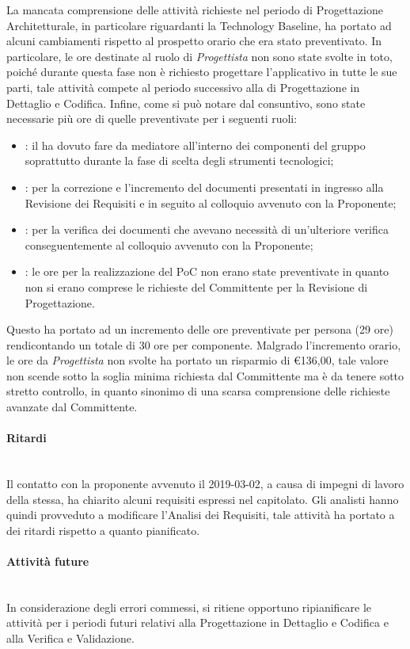 La mancata comprensione delle attività richieste nel periodo di Progettazione Architetturale, in particolare riguardanti la Technology Baseline, ha portato ad alcuni cambiamenti rispetto al prospetto orario che era stato preventivato. In particolare, le ore destinate al ruolo di \textit{Progettista} non sono state svolte in toto, poiché durante questa fase non è richiesto progettare l'applicativo in tutte le sue parti, tale attività compete al periodo successivo alla di Progettazione in Dettaglio e Codifica. Infine, come si può notare dal consuntivo, sono state necessarie più ore di quelle preventivate per i seguenti ruoli:
\begin{itemize}
	\item \RdP{}: il \Res{} ha dovuto fare da mediatore all'interno dei componenti del gruppo soprattutto durante la fase di scelta degli strumenti tecnologici;
	\item \ana{}: per la correzione e l'incremento del documenti presentati in ingresso alla Revisione dei Requisiti e in seguito al colloquio avvenuto con la Proponente;
	\item \ver{}: per la verifica dei documenti che avevano necessità di un'ulteriore verifica conseguentemente al colloquio avvenuto con la Proponente;
	\item \progr{}: le ore per la realizzazione del PoC non erano state preventivate  in quanto non si erano comprese le richieste del Committente per la Revisione di Progettazione. 
\end{itemize} 
Questo ha portato ad un incremento delle ore preventivate per persona (29 ore) rendicontando un totale di 30 ore per componente.
Malgrado l'incremento orario, le ore da \textit{Progettista} non svolte ha portato un risparmio di \euro 136,00, tale valore non scende sotto la soglia minima richiesta dal Committente ma è da tenere sotto stretto controllo, in quanto sinonimo di una scarsa comprensione delle richieste avanzate dal Committente.
\paragraph{Ritardi}\mbox{}\\
Il contatto con la proponente avvenuto il 2019-03-02, a causa di impegni di lavoro della stessa, ha chiarito alcuni requisiti espressi nel capitolato. Gli analisti hanno quindi provveduto a modificare l'Analisi dei Requisiti, tale attività ha portato a dei ritardi rispetto a quanto pianificato.

\paragraph{Attività future}\mbox{}\\
In considerazione degli errori commessi, si ritiene opportuno ripianificare le attività per i periodi futuri 
relativi alla Progettazione in Dettaglio e Codifica e alla Verifica e Validazione. 


